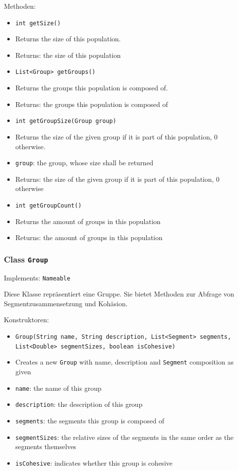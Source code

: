 \documentclass[parskip=full,11pt]{scrartcl}
\begin{document}
Methoden:
\begin{itemize}\itemsep -10pt
\item \texttt{int getSize()}
\item[] Returns the size of this population.
\item[] Returns: the size of this population

\item \texttt{List<Group> getGroups()}
\item[] Returns the groups this population is composed of.
\item[] Returns: the groups this population is composed of

\item \texttt{int getGroupSize(Group group)}
\item[] Returns the size of the given group if it is part of this population, \(0\) otherwise.
\item[] \texttt{group}: the group, whose size shall be returned
\item[] Returns: the size of the given group if it is part of this population, \(0\) otherwise

\item \texttt{int getGroupCount()}
\item[] Returns the amount of groups in this population
\item[] Returns: the amount of groups in this population
\end{itemize}

\subsubsection{Class \texttt{Group}}
Implements: \texttt{Nameable}

Diese Klasse repräsentiert eine Gruppe. Sie bietet Methoden zur Abfrage von Segmentzusammensetzung und Kohäsion.

Konstruktoren:
\begin{itemize}\itemsep -10pt
\item \texttt{Group(String name, String description, List<Segment> segments, List<Double> segmentSizes, boolean isCohesive)}
\item[] Creates a new \texttt{Group} with name, description and \texttt{Segment} composition as given
\item[] \texttt{name}: the name of this group
\item[] \texttt{description}: the description of this group
\item[] \texttt{segments}: the segments this group is composed of
\item[] \texttt{segmentSizes}: the relative sizes of the segments in the same order as the segments themselves
\item[] \texttt{isCohesive}: indicates whether this group is cohesive
\end{itemize}
\end{document}
